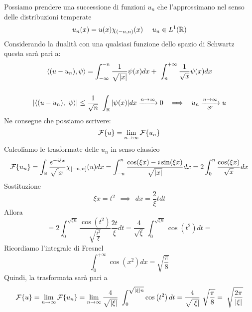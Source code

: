 Possiamo prendere una successione di funzioni $u_{n}$ che l'approssimano nel senso delle distribuzioni temperate
\begin{equation*}
u_{n}(x) = u(x) \chi _{(- n,n)}(x) \ \ \ \ u_{n} \in L^{1} (\mathbb{R})
\end{equation*}
Considerando la dualità con una qualsiasi funzione dello spazio di Schwartz questa sarà pari a:
\begin{gather*}
\langle (u - u_{n}) ,\psi \rangle = \int ^{ - n}_{ - \infty }\frac{1}{\sqrt{| x| }} \psi (x) dx + \ \int ^{ + \infty }_{n}\frac{1}{\sqrt{x}} \psi (x) dx\\
\\
| \langle (u - u_{n}) ,\ \psi \rangle | \leq \frac{1}{\sqrt{n}} \ \int _{\RR }| \psi (x)| dx\xrightarrow{n\rightarrow \infty } 0\ \ \implies \ \ u_{n}\xrightarrow[\Sc  ']{n\rightarrow \infty } u
\end{gather*}
Ne consegue che possiamo scrivere:
\begin{equation*}
\mathcal{F} \{u\} = \lim _{n\rightarrow \infty }\mathcal{F} \{u_{n}\}
\end{equation*}
Calcoliamo le trasformate delle $u_{n}$ in senso classico
\begin{equation*}
\mathcal{F} \{u_{n}\} = \int _{\mathbb{R} }\frac{e^{ - i\xi x}}{\sqrt{|} x|} \chi _{[ - n,n]} (u)dx = \int ^{n}_{ - n}\frac{\cos(\xi x) - i\sin (\xi x)}{\sqrt{| x| }} dx = 2\int ^{n}_{0}\frac{\cos(\xi x)}{\sqrt{x}} dx
\end{equation*}
Sostituzione
\begin{equation*}
\xi x = t^{2} \ \ \implies \ \ dx = \frac{2}{\xi } tdt
\end{equation*}
Allora
\begin{equation*}
= 2\int ^{\sqrt{\xi n}}_{0}\frac{\cos\left(t^{2}\right)}{\sqrt{\frac{t^{2}}{\xi }}}\frac{2t}{\xi } dt = \frac{4}{\sqrt{\xi }} \ \int ^{\sqrt{\xi n}}_{0}\cos\left(t^{2}\right) dt =
\end{equation*}
Ricordiamo l'integrale di Fresnel
\begin{equation*}
\int ^{ + \infty }_{0}\cos\left(x^{2}\right) dx = \sqrt{\frac{\pi }{8}}
\end{equation*}
Quindi, la trasformata sarà pari a
\begin{equation*}
\Fc \{u\} = \lim _{n\rightarrow \infty }\Fc \{u_{n}\} = \lim _{n\rightarrow \infty }\frac{4}{\sqrt{| \xi | }} \ \int ^{\sqrt{| \xi | n}}_{0}\cos\left(t^{2}\right) dt = \frac{4}{\sqrt{| \xi | }} \ \sqrt{\frac{\pi }{8}} = \ \sqrt{\frac{2\pi }{| \xi | }}
\end{equation*}
